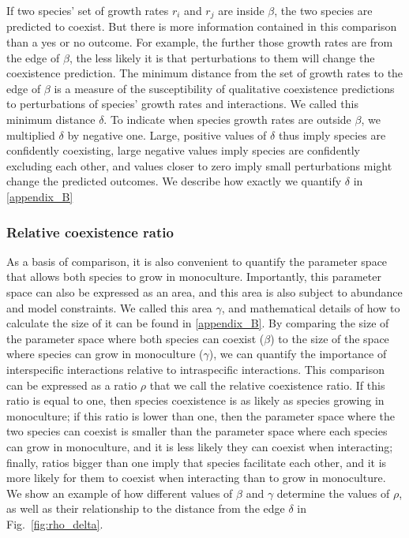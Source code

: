 \begin{refsection}
If two species' set of growth rates $r_{i}$ and $r_{j}$ are inside $\beta$, the two species are predicted to coexist. But there is more information contained in this comparison than a yes or no outcome. For example, the further those growth rates are from the edge of $\beta$, the less likely it is that perturbations to them will change the coexistence prediction. The minimum distance from the set of growth rates to the edge of $\beta$ is a measure of the susceptibility of qualitative coexistence predictions to perturbations of species' growth rates and interactions. We called this minimum distance $\delta$. To indicate when species growth rates are outside $\beta$, we multiplied $\delta$ by negative one. Large, positive values of $\delta$  thus imply species are confidently coexisting, large negative values imply species are confidently excluding each other, and values closer to zero imply small perturbations might change the predicted outcomes. We describe how exactly we quantify $\delta$ in \autoref{appendix_B}


\subsubsection*{Relative coexistence ratio}

As a basis of comparison, it is also convenient to quantify the parameter space that allows both species to grow in monoculture. Importantly, this parameter space can also be expressed as an area, and this area is also subject to abundance and model constraints. We called this area $\gamma$, and mathematical details of how to calculate the size of it can be found in \autoref{appendix_B}. By comparing the size of the parameter space where both species can coexist ($\beta$) to the size of the space where species can grow in monoculture ($\gamma$), we can quantify the importance of interspecific interactions relative to intraspecific interactions. This comparison can be expressed as a ratio $\rho$ that we call the relative coexistence ratio. If this ratio is equal to one, then species coexistence is as likely as species growing in monoculture; if this ratio is lower than one, then the parameter space where the two species can coexist is smaller than the parameter space where each species can grow in monoculture,  and it is less likely they can coexist when interacting; finally, ratios bigger than one imply that species facilitate each other, and it is more likely for them to coexist when interacting than to grow in monoculture. We show an example of how different values of $\beta$ and $\gamma$ determine the values of $\rho$, as well as their relationship to the distance from the edge $\delta$ in Fig.~\ref{fig:rho_delta}.


\end{refsection}

